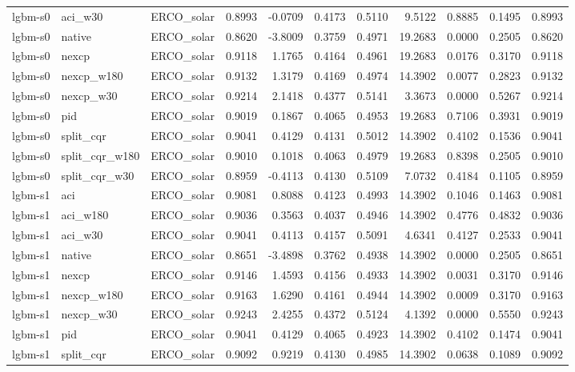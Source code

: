 \begin{tabular}{lllrrrrrrrr}
lgbm-s0 & aci_w30 & ERCO_solar & 0.8993 & -0.0709 & 0.4173 & 0.5110 & 9.5122 & 0.8885 & 0.1495 & 0.8993 \\
lgbm-s0 & native & ERCO_solar & 0.8620 & -3.8009 & 0.3759 & 0.4971 & 19.2683 & 0.0000 & 0.2505 & 0.8620 \\
lgbm-s0 & nexcp & ERCO_solar & 0.9118 & 1.1765 & 0.4164 & 0.4961 & 19.2683 & 0.0176 & 0.3170 & 0.9118 \\
lgbm-s0 & nexcp_w180 & ERCO_solar & 0.9132 & 1.3179 & 0.4169 & 0.4974 & 14.3902 & 0.0077 & 0.2823 & 0.9132 \\
lgbm-s0 & nexcp_w30 & ERCO_solar & 0.9214 & 2.1418 & 0.4377 & 0.5141 & 3.3673 & 0.0000 & 0.5267 & 0.9214 \\
lgbm-s0 & pid & ERCO_solar & 0.9019 & 0.1867 & 0.4065 & 0.4953 & 19.2683 & 0.7106 & 0.3931 & 0.9019 \\
lgbm-s0 & split_cqr & ERCO_solar & 0.9041 & 0.4129 & 0.4131 & 0.5012 & 14.3902 & 0.4102 & 0.1536 & 0.9041 \\
lgbm-s0 & split_cqr_w180 & ERCO_solar & 0.9010 & 0.1018 & 0.4063 & 0.4979 & 19.2683 & 0.8398 & 0.2505 & 0.9010 \\
lgbm-s0 & split_cqr_w30 & ERCO_solar & 0.8959 & -0.4113 & 0.4130 & 0.5109 & 7.0732 & 0.4184 & 0.1105 & 0.8959 \\
lgbm-s1 & aci & ERCO_solar & 0.9081 & 0.8088 & 0.4123 & 0.4993 & 14.3902 & 0.1046 & 0.1463 & 0.9081 \\
lgbm-s1 & aci_w180 & ERCO_solar & 0.9036 & 0.3563 & 0.4037 & 0.4946 & 14.3902 & 0.4776 & 0.4832 & 0.9036 \\
lgbm-s1 & aci_w30 & ERCO_solar & 0.9041 & 0.4113 & 0.4157 & 0.5091 & 4.6341 & 0.4127 & 0.2533 & 0.9041 \\
lgbm-s1 & native & ERCO_solar & 0.8651 & -3.4898 & 0.3762 & 0.4938 & 14.3902 & 0.0000 & 0.2505 & 0.8651 \\
lgbm-s1 & nexcp & ERCO_solar & 0.9146 & 1.4593 & 0.4156 & 0.4933 & 14.3902 & 0.0031 & 0.3170 & 0.9146 \\
lgbm-s1 & nexcp_w180 & ERCO_solar & 0.9163 & 1.6290 & 0.4161 & 0.4944 & 14.3902 & 0.0009 & 0.3170 & 0.9163 \\
lgbm-s1 & nexcp_w30 & ERCO_solar & 0.9243 & 2.4255 & 0.4372 & 0.5124 & 4.1392 & 0.0000 & 0.5550 & 0.9243 \\
lgbm-s1 & pid & ERCO_solar & 0.9041 & 0.4129 & 0.4065 & 0.4923 & 14.3902 & 0.4102 & 0.1474 & 0.9041 \\
lgbm-s1 & split_cqr & ERCO_solar & 0.9092 & 0.9219 & 0.4130 & 0.4985 & 14.3902 & 0.0638 & 0.1089 & 0.9092 \\

\end{tabular}
